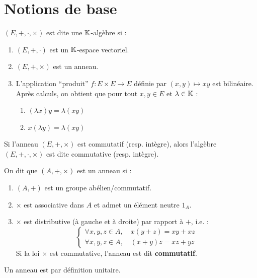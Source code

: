 \documentclass[11pt,a4paper]{report}
\begin{document}
\MakeSwissCover

\tableofcontents

\chapter{Notions de base}

\begin{definition}[Algèbre]
    $(E,+,\cdot,\times)$ est dite une $\mathbb{K}$-algèbre si :
    \begin{enumerate}
        \item $(E,+,\cdot)$ est un $\mathbb{K}$-espace vectoriel.
        \item $(E,+,\times)$ est un anneau.
        \item L'application ``produit'' $f : E \times E \to E$ définie par $(x,y) \mapsto xy$ est bilinéaire. Après calculs, on obtient que pour tout $x,y \in E$ et $\lambda \in \mathbb{K}$ :
        \begin{enumerate}
            \item $(\lambda x)y = \lambda(xy)$
            \item $x(\lambda y) = \lambda(xy)$
        \end{enumerate}
    \end{enumerate}
    Si l'anneau $(E,+,\times)$ est commutatif (resp. intègre), alors l'algèbre $(E,+,\cdot,\times)$ est dite commutative (resp. intègre).
\end{definition}

\begin{rappel}
    On dit que $(A,+,\times)$ est un anneau si :
    \begin{enumerate}
        \item $(A,+)$ est un groupe abélien/commutatif.
        \item $\times$ est associative dans $A$ et admet un élément neutre $1_A$.
        \item $\times$ est distributive (à gauche et à droite) par rapport à $+$, i.e. :
        $$\begin{cases}
            \forall x,y,z \in A, \quad x(y+z) = xy + xz \\
            \forall x,y,z \in A, \quad (x+y)z = xz + yz
        \end{cases}$$
        Si la loi $\times$ est commutative, l'anneau est dit \textbf{commutatif}.
    \end{enumerate}
\end{rappel}

\begin{attention}
    Un anneau est par définition unitaire.
\end{attention}
\end{document}
